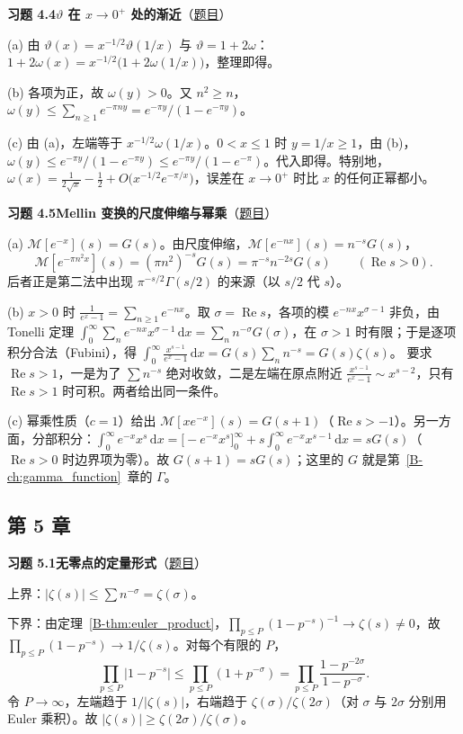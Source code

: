 \documentclass[11pt,a4paper]{article}
\newcommand{\dd}{\,\mathrm{d}}
\renewcommand{\Re}{\operatorname{Re}}
\newcommand{\bref}[1]{\ref*{B-#1}}
\newcommand{\Sol}[2]{%
  \par\addvspace{1.2em}\noindent
  \hypertarget{s:#1}{}\textbf{习题 #1\quad #2}\hfill{\small（\hyperlink{q:#1}{题目}）}\par
  \nopagebreak\smallskip}
\begin{document}
\Sol{4.4}{$\vartheta$ 在 $x\to0^+$ 处的渐近}
(a) 由 $\vartheta(x)=x^{-1/2}\vartheta(1/x)$ 与 $\vartheta=1+2\omega$：$1+2\omega(x)=x^{-1/2}\bigl(1+2\omega(1/x)\bigr)$，整理即得。

(b) 各项为正，故 $\omega(y)>0$。又 $n^2\ge n$，$\omega(y)\le\sum_{n\ge1}e^{-\pi ny}=e^{-\pi y}/(1-e^{-\pi y})$。

(c) 由 (a)，左端等于 $x^{-1/2}\omega(1/x)$。$0<x\le1$ 时 $y=1/x\ge1$，由 (b)，$\omega(y)\le e^{-\pi y}/(1-e^{-\pi y})\le e^{-\pi y}/(1-e^{-\pi})$。代入即得。特别地，$\omega(x)=\tfrac1{2\sqrt x}-\tfrac12+O\bigl(x^{-1/2}e^{-\pi/x}\bigr)$，误差在 $x\to0^+$ 时比 $x$ 的任何正幂都小。

\Sol{4.5}{Mellin 变换的尺度伸缩与幂乘}
(a) $\mathcal M[e^{-x}](s)=G(s)$。由尺度伸缩，$\mathcal M[e^{-nx}](s)=n^{-s}G(s)$，
\[
  \mathcal M[e^{-\pi n^2x}](s)=(\pi n^2)^{-s}G(s)=\pi^{-s}n^{-2s}G(s)\qquad(\Re s>0).
\]
后者正是第二法中出现 $\pi^{-s/2}\Gamma(s/2)$ 的来源（以 $s/2$ 代 $s$）。

(b) $x>0$ 时 $\frac1{e^x-1}=\sum_{n\ge1}e^{-nx}$。取 $\sigma=\Re s$，各项的模 $e^{-nx}x^{\sigma-1}$ 非负，由 Tonelli 定理
$\int_0^\infty\sum_ne^{-nx}x^{\sigma-1}\dd x=\sum_nn^{-\sigma}G(\sigma)$，在 $\sigma>1$ 时有限；于是逐项积分合法（Fubini），得 $\int_0^\infty\frac{x^{s-1}}{e^x-1}\dd x=G(s)\sum_nn^{-s}=G(s)\zeta(s)$。
要求 $\Re s>1$，一是为了 $\sum n^{-s}$ 绝对收敛，二是左端在原点附近 $\frac{x^{s-1}}{e^x-1}\sim x^{s-2}$，只有 $\Re s>1$ 时可积。两者给出同一条件。

(c) 幂乘性质（$c=1$）给出 $\mathcal M[xe^{-x}](s)=G(s+1)$（$\Re s>-1$）。另一方面，分部积分：$\int_0^\infty e^{-x}x^{s}\dd x=\bigl[-e^{-x}x^s\bigr]_0^\infty+s\int_0^\infty e^{-x}x^{s-1}\dd x=sG(s)$（$\Re s>0$ 时边界项为零）。故 $G(s+1)=sG(s)$；这里的 $G$ 就是第~\bref{ch:gamma_function}~章的 $\Gamma$。

\subsection*{第 5 章}

\Sol{5.1}{无零点的定量形式}
上界：$|\zeta(s)|\le\sum n^{-\sigma}=\zeta(\sigma)$。

下界：由定理~\bref{thm:euler_product}，$\prod_{p\le P}(1-p^{-s})^{-1}\to\zeta(s)\ne0$，故 $\prod_{p\le P}(1-p^{-s})\to1/\zeta(s)$。对每个有限的 $P$，
\[
  \prod_{p\le P}|1-p^{-s}|\le\prod_{p\le P}(1+p^{-\sigma})=\prod_{p\le P}\frac{1-p^{-2\sigma}}{1-p^{-\sigma}} .
\]
令 $P\to\infty$，左端趋于 $1/|\zeta(s)|$，右端趋于 $\zeta(\sigma)/\zeta(2\sigma)$（对 $\sigma$ 与 $2\sigma$ 分别用 Euler 乘积）。故 $|\zeta(s)|\ge\zeta(2\sigma)/\zeta(\sigma)$。
\end{document}
